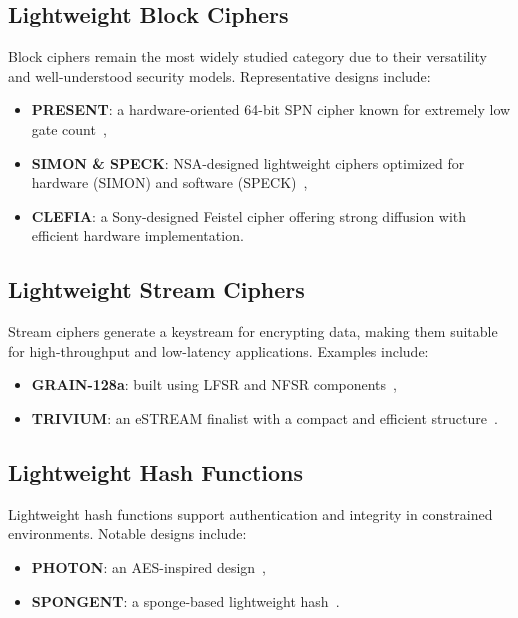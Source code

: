 \documentclass[12pt]{report}
\begin{document}
\subsection{Lightweight Block Ciphers}

Block ciphers remain the most widely studied category due to their versatility and well-understood
security models. Representative designs include:
\begin{itemize}
    \item \textbf{PRESENT}: a hardware-oriented 64-bit SPN cipher known for extremely low gate count~\cite{bogdanov2007present},
    \item \textbf{SIMON \& SPECK}: NSA-designed lightweight ciphers optimized for hardware (SIMON) and software (SPECK)~\cite{beaulieu2015simon},
    \item \textbf{CLEFIA}: a Sony-designed Feistel cipher offering strong diffusion with efficient hardware implementation.
\end{itemize}

\subsection{Lightweight Stream Ciphers}

Stream ciphers generate a keystream for encrypting data, making them suitable for high-throughput
and low-latency applications. Examples include:
\begin{itemize}
    \item \textbf{GRAIN-128a}: built using LFSR and NFSR components~\cite{hell2007grain},
    \item \textbf{TRIVIUM}: an eSTREAM finalist with a compact and efficient structure~\cite{canniere2008trivium}.
\end{itemize}

\subsection{Lightweight Hash Functions}

Lightweight hash functions support authentication and integrity in constrained environments. Notable designs include:
\begin{itemize}
    \item \textbf{PHOTON}: an AES-inspired design~\cite{guo2011photon},
    \item \textbf{SPONGENT}: a sponge-based lightweight hash~\cite{bogdanov2011spongent}.
\end{itemize}
\end{document}
